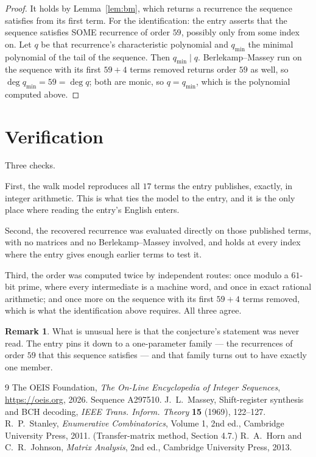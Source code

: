 \documentclass[11pt,a4paper]{article}
\theoremstyle{plain}
\theoremstyle{definition}
\newtheorem{remark}[theorem]{Remark}
\begin{document}
\begin{proof}
It holds by Lemma~\ref{lem:bm}, which returns a recurrence the sequence satisfies from its
first term. For the identification: the entry asserts that the sequence satisfies SOME
recurrence of order $59$, possibly only from some index on. Let $q$ be that recurrence's
characteristic polynomial and $q_{\min}$ the minimal polynomial of the tail of the sequence.
Then $q_{\min}\mid q$. Berlekamp--Massey run on the sequence with its first $59+4$ terms
removed returns order $59$ as well, so $\deg q_{\min}=59=\deg q$; both are monic, so
$q=q_{\min}$, which is the polynomial computed above.
\end{proof}

\section{Verification}

Three checks.

First, the walk model reproduces all $17$ terms the entry publishes, exactly, in integer
arithmetic. This is what ties the model to the entry, and it is the only place where reading
the entry's English enters.

Second, the recovered recurrence was evaluated directly on those published terms, with no
matrices and no Berlekamp--Massey involved, and holds at every index where the entry gives
enough earlier terms to test it.

Third, the order was computed twice by independent routes: once modulo a $61$-bit prime, where
every intermediate is a machine word, and once in exact rational arithmetic; and once more on
the sequence with its first $59+4$ terms removed, which is what the identification above
requires. All three agree.

\begin{remark}
What is unusual here is that the conjecture's statement was never read. The entry pins it down
to a one-parameter family --- the recurrences of order $59$ that this sequence satisfies
--- and that family turns out to have exactly one member.
\end{remark}

\begin{thebibliography}{9}
 The OEIS Foundation, \emph{The On-Line Encyclopedia of Integer
Sequences}, \url{https://oeis.org}, 2026. Sequence A297510.
 J.~L.~Massey, Shift-register synthesis and BCH decoding, \emph{IEEE
Trans. Inform. Theory} \textbf{15} (1969), 122--127.
 R.~P.~Stanley, \emph{Enumerative Combinatorics}, Volume 1, 2nd ed.,
Cambridge University Press, 2011. (Transfer-matrix method, Section 4.7.)
 R.~A.~Horn and C.~R.~Johnson, \emph{Matrix Analysis}, 2nd ed., Cambridge
University Press, 2013.
\end{thebibliography}
\end{document}
